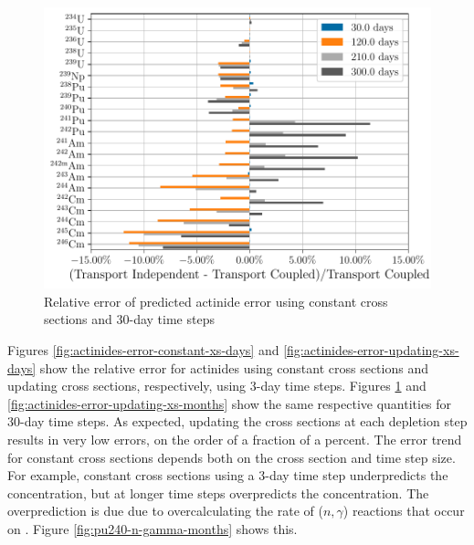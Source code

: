     \begin{figure}[h!tpb]
        \centering
        \includegraphics[width=\linewidth]{figs/actinides_constant_xs_predictor_fission_q_months.pdf}
        \caption{Relative error of predicted actinide error using
        constant cross sections and 30-day time steps}
        \label{fig:actinides-error-constant-xs-months}
    \end{figure}

    Figures \ref{fig:actinides-error-constant-xs-days} and
    \ref{fig:actinides-error-updating-xs-days} show the relative error for
    actinides using constant cross sections and updating cross sections,
    respectively, using 3-day time steps. Figures
    \ref{fig:actinides-error-constant-xs-months} and
    \ref{fig:actinides-error-updating-xs-months} show the same respective
    quantities for 30-day time steps. As expected, updating the cross sections
    at each depletion step results in very low errors, on the order of a
    fraction of a percent. The error trend for constant cross sections depends
    both on the cross section and time step size. For example, constant cross
    sections using a 3-day time step underpredicts the 
    concentration, but at longer time steps overpredicts the concentration. The
    overprediction is due due to overcalculating the rate of ($n,\gamma$)
    reactions that occur on . Figure \ref{fig:pu240-n-gamma-months}
    shows this.

